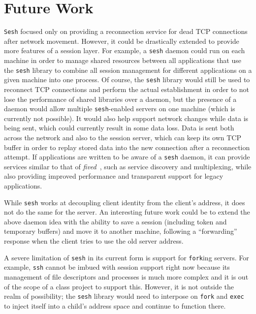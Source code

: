 \documentclass[twocolumn,10pt]{article}
\newcommand{\sesh}{\texttt{sesh}\xspace}
\newcommand{\Sesh}{\texttt{Sesh}\xspace}
\begin{document}
\section{Future Work}

\Sesh focused only on providing a reconnection service for dead TCP connections
after network movement. However, it could be drastically extended to provide
more features of a session layer. For example, a \sesh daemon could run on each
machine in order to manage shared resources between all applications that use
the \sesh library to combine all session management for different applications
on a given machine into one process. Of course, the \sesh library would still be
used to reconnect TCP connections and perform the actual establishment in order
to not lose the performance of shared libraries over a daemon, but the presence
of a daemon would allow multiple \sesh-enabled servers on one machine (which is
currently not possible). It would also help support network changes while data
is being sent, which could currently result in some data loss. Data is sent both
across the network and also to the session server, which can keep its own TCP
buffer in order to replay stored data into the new connection after a
reconnection attempt. If applications are written to be aware of a \sesh daemon,
it can provide services similar to that of \textit{fived}~\cite{wasptr-15-01},
such as service discovery and multiplexing,
while also providing improved performance and transparent support for legacy
applications.

While \sesh works at decoupling client identity from the client's address, it
does not do the same for the server. An interesting future work could be to
extend the above daemon idea with the ability to save a session (including token
and temporary buffers) and move it to another machine, following a
``forwarding'' response when the client tries to use the old server address.

A severe limitation of \sesh in its current form is support for \texttt{fork}ing
servers. For example, \texttt{ssh} cannot be imbued with session support right
now because its management of file descriptors and processes is much more
complex and it is out of the scope of a class project to support this. However,
it is not outside the realm of possibility; the \sesh library would need to
interpose on \texttt{fork} and \texttt{exec} to inject itself into a child's
address space and continue to function there.
\end{document}
